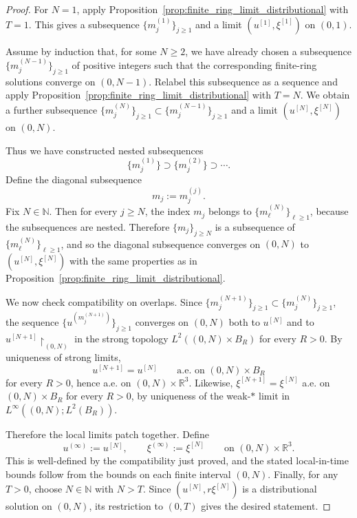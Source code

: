 \documentclass[reqno,11pt]{amsart}
\begin{document}
\begin{proof}
For \(N=1\), apply Proposition~\ref{prop:finite_ring_limit_distributional} with \(T=1\).
This gives a subsequence \(\{m_j^{(1)}\}_{j\ge1}\) and a limit
\((u^{[1]},\xi^{[1]})\) on \((0,1)\).

Assume by induction that, for some \(N\ge2\), we have already chosen a subsequence
\(\{m_j^{(N-1)}\}_{j\ge1}\) of positive integers such that the corresponding finite-ring
solutions converge on \((0,N-1)\). Relabel this subsequence as a sequence and apply
Proposition~\ref{prop:finite_ring_limit_distributional} with \(T=N\). We obtain a further
subsequence \(\{m_j^{(N)}\}_{j\ge1}\subset\{m_j^{(N-1)}\}_{j\ge1}\) and a limit
\((u^{[N]},\xi^{[N]})\) on \((0,N)\).

Thus we have constructed nested subsequences
\[
\{m_j^{(1)}\}\supset \{m_j^{(2)}\}\supset \cdots .
\]
Define the diagonal subsequence
\[
m_j:=m_j^{(j)}.
\]
Fix \(N\in\mathbb N\). Then for every \(j\ge N\), the index \(m_j\) belongs to
\(\{m_\ell^{(N)}\}_{\ell\ge1}\), because the subsequences are nested. Therefore
\(\{m_j\}_{j\ge N}\) is a subsequence of \(\{m_\ell^{(N)}\}_{\ell\ge1}\), and so the diagonal
subsequence converges on \((0,N)\) to \((u^{[N]},\xi^{[N]})\) with the same properties as in
Proposition~\ref{prop:finite_ring_limit_distributional}.

We now check compatibility on overlaps. Since
\(\{m_j^{(N+1)}\}_{j\ge1}\subset\{m_j^{(N)}\}_{j\ge1}\), the sequence
\(\{u^{(m_j^{(N+1)})}\}_{j\ge1}\) converges on \((0,N)\) both to \(u^{[N]}\) and to
\(u^{[N+1]}\!\restriction_{(0,N)}\) in the strong topology
\(L^2((0,N)\times B_R)\) for every \(R>0\). By uniqueness of strong limits,
\[
u^{[N+1]}=u^{[N]}
\qquad\text{a.e. on }(0,N)\times B_R
\]
for every \(R>0\), hence a.e. on \((0,N)\times\mathbb R^3\). Likewise,
\(\xi^{[N+1]}=\xi^{[N]}\) a.e. on \((0,N)\times B_R\) for every \(R>0\), by uniqueness
of the weak-\(*\) limit in \(L^\infty((0,N);L^2(B_R))\).

Therefore the local limits patch together. Define
\[
u^{(\infty)}:=u^{[N]},\qquad \xi^{(\infty)}:=\xi^{[N]}
\qquad\text{on }(0,N)\times\mathbb R^3.
\]
This is well-defined by the compatibility just proved, and the stated local-in-time bounds
follow from the bounds on each finite interval \((0,N)\). Finally, for any \(T>0\), choose
\(N\in\mathbb N\) with \(N>T\). Since \((u^{[N]},r\xi^{[N]})\) is a distributional solution on
\((0,N)\), its restriction to \((0,T)\) gives the desired statement.
\end{proof}
\end{document}
